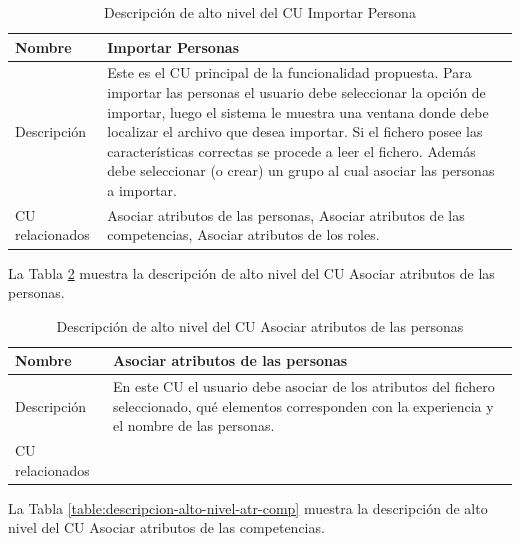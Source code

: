\begin{table}[H]
	\centering
	\caption{Descripción de alto nivel del CU Importar Persona} \label{table:descripcion-alto-nivel-importar}
	\begin{tabular}{ | l | p{10cm} |}
		\toprule
		Nombre & Importar Personas \\ \midrule
		Descripción & Este es el CU principal de la funcionalidad propuesta. Para importar las personas el usuario debe seleccionar la opción de importar, luego el sistema le muestra una ventana donde debe localizar el archivo que desea importar. Si el fichero posee las características correctas se procede a leer el fichero. Además debe seleccionar (o crear) un grupo al cual asociar las personas a importar.\\ \hline
		CU relacionados & Asociar atributos de las personas, Asociar atributos de las competencias, Asociar atributos de los roles.\\ \bottomrule
	\end{tabular}
\end{table}

La Tabla \ref{table:descripcion-alto-nivel-atr-pers} muestra la descripción de alto nivel del CU Asociar atributos de las personas.

\begin{table}[H]
	\centering
	\caption{Descripción de alto nivel del CU Asociar atributos de las personas} \label{table:descripcion-alto-nivel-atr-pers}
	\begin{tabular}{ | l | p{10cm} |}
		\toprule
		Nombre          & Asociar atributos de las personas                                                                                                                                                \\ \midrule
		Descripción     & En este CU el usuario debe asociar de los atributos del fichero seleccionado, qué elementos corresponden con la experiencia y el nombre de las personas. \\ \hline
		CU relacionados &  \\ \bottomrule
	\end{tabular}
\end{table}

La Tabla \ref{table:descripcion-alto-nivel-atr-comp} muestra la descripción de alto nivel del CU Asociar atributos de las competencias.

